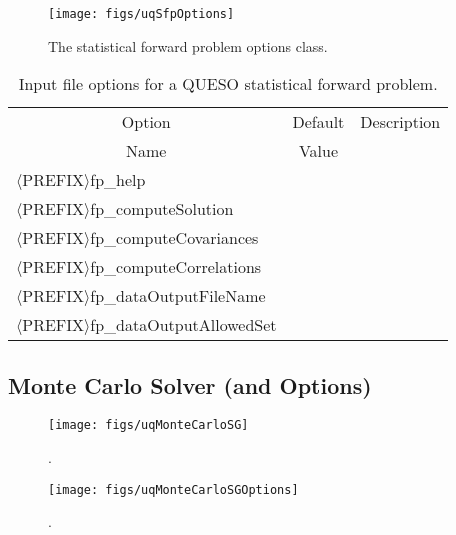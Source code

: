 \begin{figure}[h!]
\begin{center}
\texttt{[image: figs/uqSfpOptions]}
\end{center}
\caption{
The statistical forward problem options class.
}
\label{fig-sfp-options-class}
\end{figure}

\begin{table}[!h]
\begin{center}
\begin{tabular}{|l|c|c|}
\hline
\multicolumn{1}{|c|}{Option}                     & Default & Description \\
\multicolumn{1}{|c|}{Name}                       & Value   &             \\
\hline
\hline
$\langle$PREFIX$\rangle$fp\_help                 &         &             \\
\hline
$\langle$PREFIX$\rangle$fp\_computeSolution      &         &             \\
\hline
$\langle$PREFIX$\rangle$fp\_computeCovariances   &         &             \\
\hline
$\langle$PREFIX$\rangle$fp\_computeCorrelations  &         &             \\
\hline
$\langle$PREFIX$\rangle$fp\_dataOutputFileName   &         &             \\
\hline
$\langle$PREFIX$\rangle$fp\_dataOutputAllowedSet &         &             \\
\hline
\end{tabular}
\end{center}
\caption{
Input file options for a QUESO statistical forward problem.
}
\label{tab-sfp-options}
\end{table}

\subsection{Monte Carlo Solver (and Options)}

\begin{figure}[h!]
\centerline{
\texttt{[image: figs/uqMonteCarloSG]}
}
\caption{
{\color{red}{The Monte Carlo sequence generator class}}.
}
\label{fig-monte-carlo-solver-class}
\end{figure}

\begin{figure}[h!]
\begin{center}
\texttt{[image: figs/uqMonteCarloSGOptions]}
\end{center}
\caption{
{\color{red}{The Monte Carlo sequence generator options class}}.
}
\label{fig-monte-carlo-options-class}
\end{figure}

